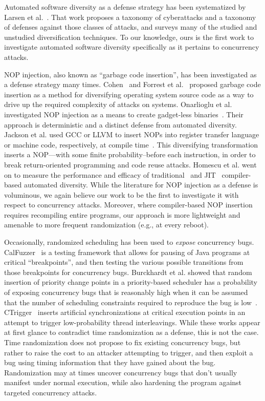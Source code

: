 Automated software diversity as a defense strategy has been systematized by Larsen et al.~\cite{Larsen2014}.
That work proposes a taxonomy of cyberattacks and a taxonomy of defenses against those classes of attacks, and surveys many of the studied and unstudied diversification techniques.
To our knowledge, ours is the first work to investigate automated software diversity specifically as it pertains to concurrency attacks.

NOP injection, also known as ``garbage code insertion'', has been investigated as a defense strategy many times.
Cohen~\cite{Cohen1993} and Forrest et al.~\cite{Forrest1997} proposed garbage code insertion as a method for diversifying operating system source code as a way to drive up the required complexity of attacks on systems.
Onarlioglu et al. investigated NOP injection as a means to create gadget-less binaries~\cite{Onarlioglu2010}.
Their approach is deterministic and a distinct defense from automated diversity.
Jackson et al. used GCC or LLVM to insert NOPs into register transfer language or machine code, respectively, at compile time~\cite{Jackson2013}.
This diversifying transformation inserts a NOP---with some finite probability--before each instruction, in order to break return-oriented programming and code reuse attacks.
Homescu et al. went on to measure the performance and efficacy of traditional~\cite{Homescu2013a} and JIT~\cite{Homescu2013} compiler-based automated diversity.
While the literature for NOP injection as a defense is voluminous, we again believe our work to be the first to investigate it with respect to concurrency attacks.
Moreover, where compiler-based NOP insertion requires recompiling entire programs, our approach is more lightweight and amenable to more frequent randomization (e.g., at every reboot).

Occasionally, randomized scheduling has been used to \textit{expose} concurrency bugs.
CalFuzzer~\cite{Joshi2009} is a testing framework that allows for pausing of Java programs at critical ``breakpoints'', and then testing the various possible transitions from those breakpoints for concurrency bugs.
Burckhardt et al. showed that random insertion of priority change points in a priority-based scheduler has a probability of exposing concurrency bugs that is reasonably high when it can be assumed that the number of scheduling constraints required to reproduce the bug is low~\cite{Burckhardt2010}.
CTrigger~\cite{Park2009} inserts artificial synchronizations at critical execution points in an attempt to trigger low-probability thread interleavings.
While these works appear at first glance to contradict time randomization as a defense, this is not the case.
Time randomization does not propose to fix existing concurrency bugs, but rather to raise the cost to an attacker attempting to trigger, and then exploit a bug using timing information that they have gained about the bug.
Randomization may at times uncover concurrency bugs that don't usually manifest under normal execution, while also hardening the program against targeted concurrency attacks.